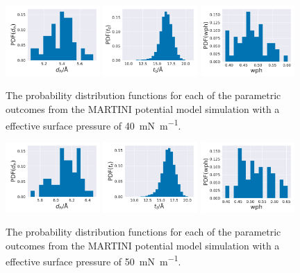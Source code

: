\documentclass[amsmath,amssymb,superscriptaddress]{revtex4-1}
\begin{document}
\begin{figure}
 \centering
 \includegraphics[width=0.32\textwidth]{martini_40_dh}
 \includegraphics[width=0.32\textwidth]{martini_40_tt}
 \includegraphics[width=0.32\textwidth]{martini_40_wph}
 \caption{The probability distribution functions for each of the parametric outcomes from the MARTINI potential model simulation with a effective surface pressure of \SI{40}{\milli\newton\per\meter}.}
 \label{fig:ma40}
\end{figure}
%
%
\begin{figure}
 \centering
 \includegraphics[width=0.32\textwidth]{martini_50_dh}
 \includegraphics[width=0.32\textwidth]{martini_50_tt}
 \includegraphics[width=0.32\textwidth]{martini_50_wph}
 \caption{The probability distribution functions for each of the parametric outcomes from the MARTINI potential model simulation with a effective surface pressure of \SI{50}{\milli\newton\per\meter}.}
 \label{fig:ma50}
\end{figure}
%


\end{document}

